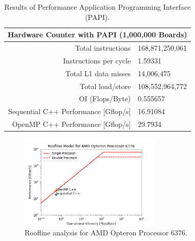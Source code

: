 \documentclass[12pt]{article}
\begin{document}
\begin{table}[H]
    \centering
    \begin{tabular}{rl}
        \hline\hline
        \multicolumn{2}{c}{Hardware Counter with PAPI (1,000,000 Boards)} \\
        \hline \hline
        Total instructions & 168,871,250,061 \\
        Instructions per cycle & 1.59331 \\
        Total L1 data misses & 14,006,475  \\
        Total load/store & 108,552,964,772  \\
        OI (Flops/Byte) & 0.555657  \\
        Sequential C++ Performance [Gflop/s] & 16.91084 \\
        OpenMP C++ Performance [Gflop/s] & 29.7934 \\
        \hline \hline
    \end{tabular}
    \caption{Results of Performance Application Programming Interface (PAPI).}
    \label{tab:papi-results}
\end{table}

\begin{figure}[H]
    \centering
    \includegraphics[width=0.6\textwidth]{plots/roofline_amd.png}
    \caption{Roofline analysis for AMD Opteron Processor 6376.}
    \label{fig:roofline-amd}
\end{figure}
\end{document}
